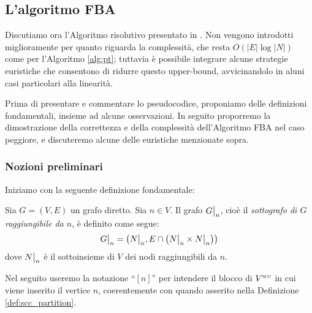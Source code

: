 \subsection{L'algoritmo FBA}
Discutiamo ora l'Algoritmo risolutivo presentato in \cite{dovier}. Non vengono introdotti miglioramente per quanto riguarda la complessità, che resta $O(|E| \log |N|)$ come per l'Algoritmo \ref{alg:pt}; tuttavia è possibile integrare alcune strategie euristiche che consentono di ridurre questo upper-bound, avvicinandolo in aluni casi particolari alla linearità.

Prima di presentare e commentare lo pseudocodice, proponiamo delle definizioni fondamentali, insieme ad alcune osservazioni. In seguito proporremo la dimostrazione della correttezza e della complessità dell'Algoritmo FBA nel caso peggiore, e discuteremo alcune delle euristiche menzionate sopra.

\subsubsection{Nozioni preliminari}
Iniziamo con la seguente definizione fondamentale:
\begin{definition}
    \label{def:grafo_restr}
    Sia $G = (V,E)$ un grafo diretto. Sia $n \in V$. Il grafo $\restr{G}{n}$, cioè il \emph{sottografo di $G$ raggiungibile da $n$}, è definito come segue:
    \begin{gather*}
        \restr{G}{n} = \left(\restr{N}{n}, E \cap \left(\restr{N}{n} \times \restr{N}{n}\right)\right)
    \end{gather*}
    dove $\restr{N}{n}$ è il sottoinsieme di $V$ dei nodi raggiungibili da $n$.
\end{definition}
Nel seguito useremo la notazione ``$[n]$'' per intendere il blocco di $V^{\superscc}$ in cui viene inserito il vertice $n$, coerentemente con quando asserito nella Definizione \ref{def:scc_partition}.

